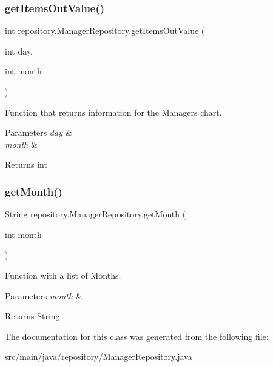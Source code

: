 \subsubsection{\texorpdfstring{get\+Items\+Out\+Value()}{getItemsOutValue()}}
{\footnotesize\ttfamily int repository.\+Manager\+Repository.\+get\+Items\+Out\+Value (\begin{DoxyParamCaption}\item[{int}]{day,  }\item[{int}]{month }\end{DoxyParamCaption})\hspace{0.3cm}{\ttfamily [inline]}}

Function that returns information for the Manager\textquotesingle{}s chart. 
\begin{DoxyParams}{Parameters}
{\em day} & \\
\hline
{\em month} & \\
\hline
\end{DoxyParams}
\begin{DoxyReturn}{Returns}
int 
\end{DoxyReturn}
\mbox{\label{classrepository_1_1_manager_repository_ae52c653f3008bfa5bc0f5af8dab9db43}} 
\subsubsection{\texorpdfstring{get\+Month()}{getMonth()}}
{\footnotesize\ttfamily String repository.\+Manager\+Repository.\+get\+Month (\begin{DoxyParamCaption}\item[{int}]{month }\end{DoxyParamCaption})\hspace{0.3cm}{\ttfamily [inline]}}

Function with a list of Months. 
\begin{DoxyParams}{Parameters}
{\em month} & \\
\hline
\end{DoxyParams}
\begin{DoxyReturn}{Returns}
String 
\end{DoxyReturn}


The documentation for this class was generated from the following file\+:\begin{DoxyCompactItemize}
\item 
src/main/java/repository/Manager\+Repository.\+java\end{DoxyCompactItemize}
